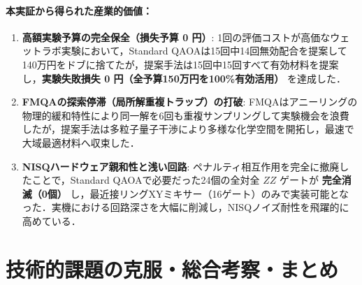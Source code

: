 \documentclass[11pt,a4paper]{ltjsarticle}
\begin{document}
\vspace{-2mm}
\paragraph{本実証から得られた産業的価値：}
\begin{enumerate}\setlength{\itemsep}{1pt}
    \item \textbf{高額実験予算の完全保全（損失予算 0 円）}:
    1回の評価コストが高価なウェットラボ実験において，Standard QAOAは15回中14回無効配合を提案して140万円をドブに捨てたが，提案手法は15回中15回すべて有効材料を提案し，\textbf{実験失敗損失 0 円（全予算150万円を100\%有効活用）} を達成した．

    \item \textbf{FMQAの探索停滞（局所解重複トラップ）の打破}:
    FMQAはアニーリングの物理的緩和特性により同一解を6回も重複サンプリングして実験機会を浪費したが，提案手法は多粒子量子干渉により多様な化学空間を開拓し，最速で大域最適材料へ収束した．

    \item \textbf{NISQハードウェア親和性と浅い回路}:
    ペナルティ相互作用を完全に撤廃したことで，Standard QAOAで必要だった24個の全対全 $ZZ$ ゲートが \textbf{完全消滅（0個）} し，最近接リングXYミキサー（16ゲート）のみで実装可能となった．実機における回路深さを大幅に削減し，NISQノイズ耐性を飛躍的に高めている．
\end{enumerate}

\clearpage

\section{技術的課題の克服・総合考察・まとめ}
\label{sec:summary}

\vspace{-1mm}
\end{document}
